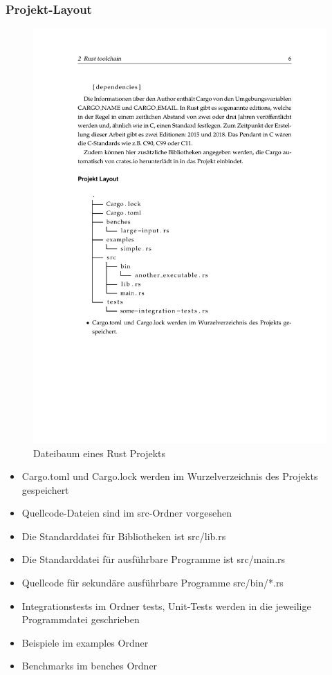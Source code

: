 \subsubsection{Projekt-Layout}

\begin{figure}[htbp]
    \centering
    \includegraphics{Toolchain/dateibaum.pdf}
    \caption{Dateibaum eines Rust Projekts}
\end{figure}

\begin{itemize}
    \item Cargo.toml und Cargo.lock werden im Wurzelverzeichnis des Projekts gespeichert
    \item Quellcode-Dateien sind im src-Ordner vorgesehen
    \item Die Standarddatei für Bibliotheken ist src/lib.rs
    \item Die Standarddatei für ausführbare Programme ist src/main.rs
    \item Quellcode für sekundäre ausführbare Programme src/bin/*.rs
    \item Integrationstests im Ordner tests, Unit-Tests werden in die jeweilige Programmdatei geschrieben
    \item Beispiele im examples Ordner
    \item Benchmarks im benches Ordner
\end{itemize}

